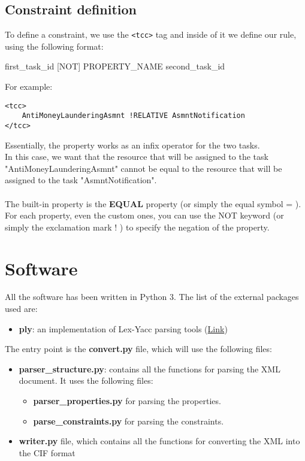 \documentclass{article}
\newcommand*{\xml}[1]{\texttt{<#1>}}
\begin{document}
\subsection{Constraint definition}
To define a constraint, we use the \xml{tcc} tag and inside of it we define our rule, using the following format:
\begin{center}
    first\_task\_id [NOT] PROPERTY\_NAME second\_task\_id
\end{center}
For example:
\begin{lstlisting}
<tcc>
    AntiMoneyLaunderingAsmnt !RELATIVE AsmntNotification
</tcc>
\end{lstlisting}
Essentially, the property works as an infix operator for the two tasks.\\
In this case, we want that the resource that will be assigned to the task "AntiMoneyLaunderingAsmnt" cannot be equal to the resource that will be assigned to the task "AsmntNotification". \\
\\
The built-in property is the \textbf{EQUAL} property (or simply the equal symbol = ). For each property, even the custom ones, you can use the NOT keyword (or simply the exclamation mark ! ) to specify the negation of the property.

\section{Software}
All the software has been written in Python 3. The list of the external packages used are:
\begin{itemize}
    \item \textbf{ply}: an implementation of Lex-Yacc parsing tools (\href{https://www.dabeaz.com/ply/}{Link})
\end{itemize}

\noindent The entry point is the \textbf{convert.py} file, which will use the following files:
\begin{itemize}
    \item \textbf{parser\_structure.py}: contains all the functions for parsing the XML document. It uses the following files:
    \begin{itemize}
        \item \textbf{parser\_properties.py} for parsing the properties.
        \item \textbf{parse\_constraints.py} for parsing the constraints.
    \end{itemize}
    \item \textbf{writer.py} file, which contains all the functions for converting the XML into the CIF format
\end{itemize}
\end{document}
